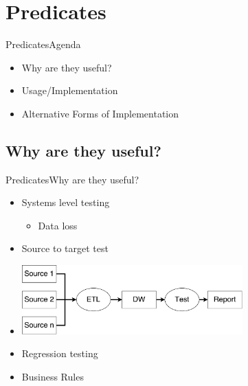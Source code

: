 
\section{Predicates}
\begin{frame}{Predicates}{Agenda}
  \begin{itemize}
    \item<1-> Why are they useful?
    \item<1-> Usage/Implementation 
    \item<1-> Alternative Forms of Implementation
  \end{itemize}
\end{frame}

\subsection{Why are they useful?}
\begin{frame}{Predicates}{Why are they useful?}
	\begin{itemize}
		\item<1-> Systems level testing
			\begin{itemize}
				\item Data loss
			\end{itemize}
		\item<2-> Source to target test
		\item<2->[] \includegraphics[width=8.5cm]{figures/scenario.pdf}
		\item<3-> Regression testing
		\item<3-> Business Rules
	\end{itemize}
\end{frame}

